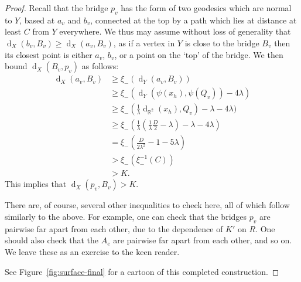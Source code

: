 \documentclass[10pt,a4paper]{amsart}
\DeclareMathOperator{\dist}{d}
\newcommand{\R}{\mathbb{R}}
\theoremstyle{definition}
\begin{document}
\begin{proof}
    Recall that the bridge $p_v$ has the form of two geodesics which are normal to $Y$, based at $a_v$ and $b_v$, connected at the top by a path which lies at distance at least $C$ from $Y$ everywhere. 
    We thus may assume without loss of generality that $\dist_X(b_v, B_v)\geq \dist_X(a_v, B_v)$, as if a vertex in $Y$ is close to the bridge $B_v$ then its closest point is either $a_v$, $b_v$, or a point on the `top' of the bridge. We then bound $\dist_X(B_v, p_v)$ as follows:
    \begin{align*}
        \dist_X(a_v, B_v) &\geq \xi_-(\dist_Y(a_v, B_v)) \\
        & \geq \xi_-(\dist_Y(\psi(x_h), \psi(Q_v)) - 4\lambda) \\
        & \geq \xi_-(\tfrac 1 \lambda \dist_{\R^2}(x_h), Q_v) - \lambda - 4\lambda) \\
        & \geq \xi_-(\tfrac 1 \lambda (\tfrac 1 \lambda \tfrac D 2 - \lambda) - \lambda - 4\lambda) \\
        & = \xi_-( \tfrac {D} {2\lambda^2} - 1 - 5\lambda) \\
        & > \xi_-(\xi_-^{-1}(C)) \\
        &> K.
    \end{align*}
    This implies that $\dist_X(p_v, B_v) > K$. 
    
    There are, of course, several other inequalities to check here, all of which follow similarly to the above. For example, one can check that the bridges $p_v$ are pairwise far apart from each other, due to the dependence of $K'$ on $R$. One should also check that the $A_e$ are pairwise far apart from each other, and so on. We leave these as an exercise to the keen reader.
    
    See Figure~\ref{fig:surface-final} for a cartoon of this completed construction. 
\end{proof}
\end{document}
